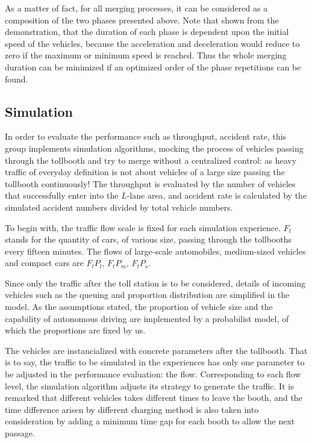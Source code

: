 \documentclass{mcmthesis}
\begin{document}
As a matter of fact, for all merging processes, it can be considered as a composition of the two phases presented above. Note that shown from the demonstration, that the duration of each phase is dependent upon the initial speed of the vehicles, because the acceleration and deceleration would reduce to zero if the maximum or minimum speed is reached. Thus the whole merging duration can be minimized if an optimized order of the phase repetitions can be found.


\subsection{Simulation}
In order to evaluate the performance such as throughput, accident rate, this group implements simulation algorithms, mocking the process of vehicles passing through the tollbooth and try to merge without a centralized control: as heavy traffic of everyday definition is not about vehicles of a large size passing the tollbooth continuously! The throughput is evaluated by the number of vehicles that successfully enter into the $L$-lane area, and accident rate is calculated by the simulated accident numbers divided by total vehicle numbers.

To begin with, the traffic flow scale is fixed for each simulation experience. $F_t$ stands for the quantity of cars, of various size, passing through the tollbooths every fifteen minutes. The flows of large-scale automobiles, medium-sized vehicles and compact cars are $F_tP_l$, $F_tP_m$, $F_tP_s$.

Since only the traffic after the toll station is to be considered, details of incoming vehicles such as the queuing and proportion distribution are simplified in the model. As the assumptions stated, the proportion of vehicle size and the capability of autonomous driving are implemented by a probabilist model, of which the proportions are fixed by us. 

The vehicles are instancialized with concrete parameters after the tollbooth. That is to say, the traffic to be simulated in the experiences has only one parameter to be adjusted in the performance evaluation: the flow. Corresponding to each flow level, the simulation algorithm adjusts its strategy to generate the traffic. It is remarked that different vehicles takes different times to leave the booth, and the time difference arisen by different charging method is also taken into consideration by adding a minimum time gap for each booth to allow the next passage.
\end{document}
